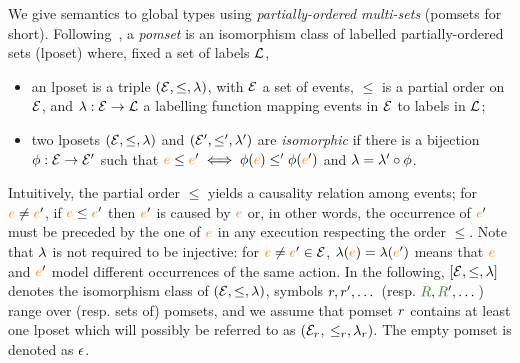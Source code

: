 
We give semantics to global types using \emph{partially-ordered
  multi-sets} (pomsets for short).
%
Following~\cite{gaifman1987partial}, a \emph{pomset} is an isomorphism
class of labelled partially-ordered sets (lposet) where, fixed a set
of labels $\mathcal{L}$,
\begin{itemize}
\item an lposet is a triple $(\mathcal{E}, \leq, \lambda)$, with $\mathcal{E}$ a set
  of events, $\leq$ is a partial order on $\mathcal{E}$, and
  $\lambda: \mathcal{E} \rightarrow \mathcal{L}$ a labelling function mapping events
  in $\mathcal{E}$ to labels in $\mathcal{L}$;
\item two lposets $(\mathcal{E}, \leq, \lambda)$ and $(\mathcal{E}', \leq', \lambda')$
  are \emph{isomorphic} if there is a bijection
  $\phi: \mathcal{E} \rightarrow \mathcal{E}'$ such that
  ${\color{orange}{e}} \leq {\color{orange}{e}}' \iff \phi({\color{orange}{e}}) \leq' \phi({\color{orange}{e}}')$ and
  $\lambda = \lambda' \circ \phi$.
\end{itemize}
%
Intuitively, the partial order $\leq$ yields a causality relation
among events; for ${\color{orange}{e}} \neq {\color{orange}{e}}'$, if ${\color{orange}{e}} \leq {\color{orange}{e}}'$ then ${\color{orange}{e}}'$ is
caused by ${\color{orange}{e}}$ or, in other words, the occurrence of ${\color{orange}{e}}'$ must be
preceded by the one of ${\color{orange}{e}}$ in any execution respecting the order
$\leq$.
%
Note that $\lambda$ is not required to be injective: for
${\color{orange}{e}} \neq {\color{orange}{e}}' \in \mathcal{E}$, $\lambda({\color{orange}{e}}) = \lambda({\color{orange}{e}}')$ means that ${\color{orange}{e}}$
and ${\color{orange}{e}}'$ model different occurrences of the same action.
%
In the following, $[\mathcal{E}, \leq, \lambda]$ denotes the isomorphism class
of $(\mathcal{E}, \leq, \lambda)$, symbols $r,r', \dots$ (resp.
$\aR, \aR', \dots$) range over (resp. sets of) pomsets, and we assume
that pomset $r$ contains at least one lposet which will possibly
be referred to as $(\mathcal{E}_{r}$, $\leq_{r}, \lambda_{r})$.
%
The empty pomset is denoted as $\epsilon$.

